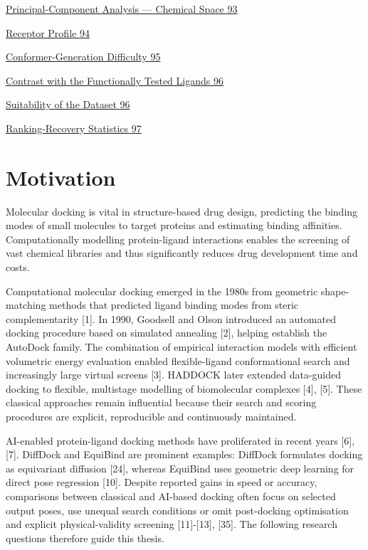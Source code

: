 \protect\hyperlink{principal-component-analysis-chemical-space}{Principal-Component Analysis --- Chemical Space \protect\hyperlink{principal-component-analysis-chemical-space}{93}}

\protect\hyperlink{receptor-profile}{Receptor Profile \protect\hyperlink{receptor-profile}{94}}

\protect\hyperlink{conformer-generation-difficulty}{Conformer-Generation Difficulty \protect\hyperlink{conformer-generation-difficulty}{95}}

\protect\hyperlink{contrast-with-the-functionally-tested-ligands}{Contrast with the Functionally Tested Ligands \protect\hyperlink{contrast-with-the-functionally-tested-ligands}{96}}

\protect\hyperlink{suitability-of-the-dataset}{Suitability of the Dataset \protect\hyperlink{suitability-of-the-dataset}{96}}

\protect\hyperlink{ranking-recovery-statistics}{Ranking-Recovery Statistics \protect\hyperlink{ranking-recovery-statistics}{97}}

\hypertarget{motivation}{%
\chapter{\texorpdfstring{Motivation }{Motivation }}\label{motivation}}

Molecular docking is vital in structure-based drug design, predicting the binding modes of small molecules to target proteins and estimating binding affinities. Computationally modelling protein-ligand interactions enables the screening of vast chemical libraries and thus significantly reduces drug development time and costs.

Computational molecular docking emerged in the 1980s from geometric shape-matching methods that predicted ligand binding modes from steric complementarity {[}1{]}. In 1990, Goodsell and Olson introduced an automated docking procedure based on simulated annealing {[}2{]}, helping establish the AutoDock family. The combination of empirical interaction models with efficient volumetric energy evaluation enabled flexible-ligand conformational search and increasingly large virtual screens {[}3{]}. HADDOCK later extended data-guided docking to flexible, multistage modelling of biomolecular complexes {[}4{]}, {[}5{]}. These classical approaches remain influential because their search and scoring procedures are explicit, reproducible and continuously maintained.

AI-enabled protein-ligand docking methods have proliferated in recent years {[}6{]}, {[}7{]}. DiffDock and EquiBind are prominent examples: DiffDock formulates docking as equivariant diffusion {[}24{]}, whereas EquiBind uses geometric deep learning for direct pose regression {[}10{]}. Despite reported gains in speed or accuracy, comparisons between classical and AI-based docking often focus on selected output poses, use unequal search conditions or omit post-docking optimisation and explicit physical-validity screening {[}11{]}-{[}13{]}, {[}35{]}. The following research questions therefore guide this thesis.

